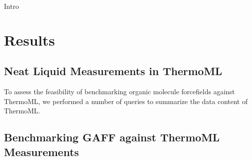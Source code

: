 \documentclass[aps,pre,twocolumn,superscriptaddress]{revtex4-1}
\begin{document}
Intro

\section{Results}

\subsection{Neat Liquid Measurements in ThermoML}

To assess the feasibility of benchmarking organic molecule forcefields against ThermoML, we performed a number of queries to summarize the data content of ThermoML.


\subsection{Benchmarking GAFF against ThermoML Measurements}
\end{document}
